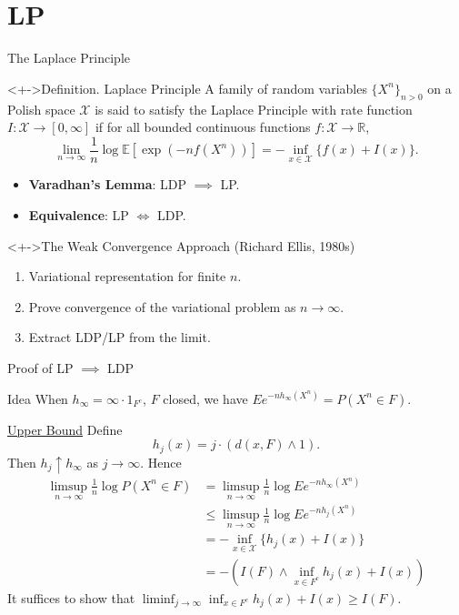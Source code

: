 \documentclass{if-beamer}
\begin{document}
\section{LP}
\begin{frame}{The Laplace Principle}
    \begin{block}<+->{Definition. Laplace Principle}
        A family of random variables $\{X^n\}_{n > 0}$ on a Polish space $\mathcal{X}$ is said to satisfy the Laplace Principle with rate function $I: \mathcal{X} \to [0, \infty]$ if for all bounded continuous functions $f: \mathcal{X} \to \mathbb{R}$,
        \[
        \lim_{n \to \infty} \frac{1}{n} \log \mathbb{E}\left[\exp\left(- n f(X^n)\right)\right] = -\inf_{x \in \mathcal{X}} \{ f(x) + I(x) \}
        .\]
    \end{block}

    \begin{itemize}[<+->]
        \item \textbf{Varadhan's Lemma}: LDP $\implies$ LP.
        \item \textbf{Equivalence}: LP $\iff$ LDP.
    \end{itemize}

    \begin{block}<+->{The Weak Convergence Approach (Richard Ellis, 1980s)}
        \begin{enumerate}
            \item Variational representation for finite $n$.
            \item Prove convergence of the variational problem as $n \to \infty$.
            \item Extract LDP/LP from the limit.
        \end{enumerate}
    \end{block}
\end{frame}

\begin{frame}{Proof of LP $\implies$ LDP}
    \begin{block}{Idea}
        When $h_\infty = \infty \cdot 1_{F^c}$, $F$ closed, we have $E e^{-n h_\infty(X^n)} = P(X^n \in F)$.
    \end{block}
    
    \underline{Upper Bound}
    Define
    \[
        h_j(x) = j \cdot (d(x, F) \wedge 1).
    \]
    Then $h_j \uparrow h_\infty$ as $j \to \infty$. Hence
    \begin{align*}
        \limsup_{n \to \infty} \frac{1}{n} \log P(X^n \in F) 
        &= \limsup_{n \to \infty} \frac{1}{n} \log E e^{-n h_\infty(X^n)} \\
        &\leq \limsup_{n \to \infty} \frac{1}{n} \log E e^{-n h_j(X^n)} \\
        &= -\inf_{x \in \mathcal{X}} \{ h_j(x) + I(x) \} \\
        &= - \left( I(F) \wedge \inf_{x \in F^c} h_j(x) + I(x) \right)
    \end{align*}
    It suffices to show that $\liminf_{j \to \infty} \inf_{x \in F^c} h_j(x) + I(x) \geq I(F)$.
\end{frame}
\end{document}
